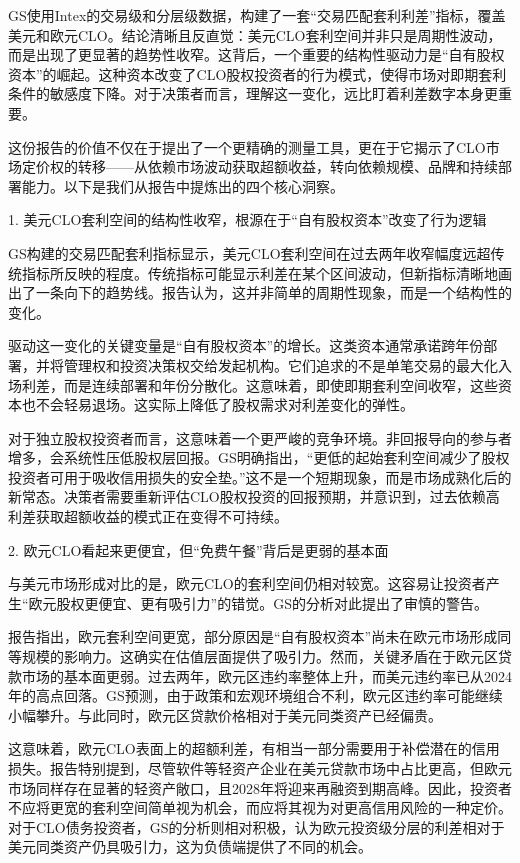 \documentclass[11pt]{ctexart}
\begin{document}
GS使用Intex的交易级和分层级数据，构建了一套“交易匹配套利利差”指标，覆盖美元和欧元CLO。结论清晰且反直觉：美元CLO套利空间并非只是周期性波动，而是出现了更显著的趋势性收窄。这背后，一个重要的结构性驱动力是“自有股权资本”的崛起。这种资本改变了CLO股权投资者的行为模式，使得市场对即期套利条件的敏感度下降。对于决策者而言，理解这一变化，远比盯着利差数字本身更重要。

这份报告的价值不仅在于提出了一个更精确的测量工具，更在于它揭示了CLO市场定价权的转移——从依赖市场波动获取超额收益，转向依赖规模、品牌和持续部署能力。以下是我们从报告中提炼出的四个核心洞察。

1. 美元CLO套利空间的结构性收窄，根源在于“自有股权资本”改变了行为逻辑

GS构建的交易匹配套利指标显示，美元CLO套利空间在过去两年收窄幅度远超传统指标所反映的程度。传统指标可能显示利差在某个区间波动，但新指标清晰地画出了一条向下的趋势线。报告认为，这并非简单的周期性现象，而是一个结构性的变化。

驱动这一变化的关键变量是“自有股权资本”的增长。这类资本通常承诺跨年份部署，并将管理权和投资决策权交给发起机构。它们追求的不是单笔交易的最大化入场利差，而是连续部署和年份分散化。这意味着，即使即期套利空间收窄，这些资本也不会轻易退场。这实际上降低了股权需求对利差变化的弹性。

对于独立股权投资者而言，这意味着一个更严峻的竞争环境。非回报导向的参与者增多，会系统性压低股权层回报。GS明确指出，“更低的起始套利空间减少了股权投资者可用于吸收信用损失的安全垫。”这不是一个短期现象，而是市场成熟化后的新常态。决策者需要重新评估CLO股权投资的回报预期，并意识到，过去依赖高利差获取超额收益的模式正在变得不可持续。

2. 欧元CLO看起来更便宜，但“免费午餐”背后是更弱的基本面

与美元市场形成对比的是，欧元CLO的套利空间仍相对较宽。这容易让投资者产生“欧元股权更便宜、更有吸引力”的错觉。GS的分析对此提出了审慎的警告。

报告指出，欧元套利空间更宽，部分原因是“自有股权资本”尚未在欧元市场形成同等规模的影响力。这确实在估值层面提供了吸引力。然而，关键矛盾在于欧元区贷款市场的基本面更弱。过去两年，欧元区违约率整体上升，而美元违约率已从2024年的高点回落。GS预测，由于政策和宏观环境组合不利，欧元区违约率可能继续小幅攀升。与此同时，欧元区贷款价格相对于美元同类资产已经偏贵。

这意味着，欧元CLO表面上的超额利差，有相当一部分需要用于补偿潜在的信用损失。报告特别提到，尽管软件等轻资产企业在美元贷款市场中占比更高，但欧元市场同样存在显著的轻资产敞口，且2028年将迎来再融资到期高峰。因此，投资者不应将更宽的套利空间简单视为机会，而应将其视为对更高信用风险的一种定价。对于CLO债务投资者，GS的分析则相对积极，认为欧元投资级分层的利差相对于美元同类资产仍具吸引力，这为负债端提供了不同的机会。
\end{document}
